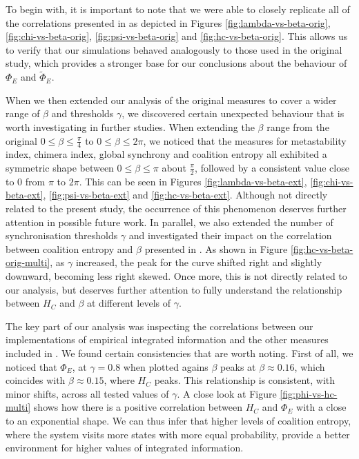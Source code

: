\documentclass[a4paper,11pt]{article}
\begin{document}
To begin with, it is important to note that we were able to closely replicate all of the correlations presented in \cite{Shanahan2010} as depicted in Figures \ref{fig:lambda-vs-beta-orig}, \ref{fig:chi-vs-beta-orig}, \ref{fig:psi-vs-beta-orig} and \ref{fig:hc-vs-beta-orig}. This allows us to verify that our simulations behaved analogously to those used in the original study, which provides a stronger base for our conclusions about the behaviour of $\Phi_E$ and $\widetilde{\Phi}_E$. 

When we then extended our analysis of the original measures to cover a wider range of $\beta$ and thresholds $\gamma$, we discovered certain unexpected behaviour that is worth investigating in further studies. When extending the $\beta$ range from the original $0 \leq \beta \leq \frac{\pi}{4}$ to $0 \leq \beta \leq 2\pi$, we noticed that the measures for metastability index, chimera index, global synchrony and coalition entropy all exhibited a symmetric shape between $0 \leq \beta \leq \pi$ about $\frac{\pi}{2}$, followed by a consistent value close to $0$ from $\pi$ to $2\pi$. This can be seen in Figures \ref{fig:lambda-vs-beta-ext}, \ref{fig:chi-vs-beta-ext}, \ref{fig:psi-vs-beta-ext} and \ref{fig:hc-vs-beta-ext}. Although not directly related to the present study, the occurrence of this phenomenon deserves further attention in possible future work. In parallel, we also extended the number of synchronisation thresholds  $\gamma$ and investigated their impact on the correlation between coalition entropy and $\beta$ presented in \cite{Shanahan2010}. As shown in Figure \ref{fig:hc-vs-beta-orig-multi}, as $\gamma$ increased, the peak for the curve shifted right and slightly downward, becoming less right skewed. Once more, this is not directly related to our analysis, but deserves further attention to fully understand the relationship between $H_C$ and $\beta$ at different levels of $\gamma$.

The key part of our analysis was inspecting the correlations between our implementations of empirical integrated information and the other measures included in \cite{Shanahan2010}. We found certain consistencies that are worth noting. First of all, we noticed that $\Phi_E$, at $\gamma = 0.8$ when plotted agains $\beta$ peaks at $\beta \approx 0.16$, which coincides with $\beta \approx 0.15$, where $H_C$ peaks. This relationship is consistent, with minor shifts, across all tested values of $\gamma$. A close look at Figure \ref{fig:phi-vs-hc-multi} shows how there is a positive correlation between $H_C$ and $\Phi_E$ with a close to an exponential shape. We can thus infer that higher levels of coalition entropy, where the system visits more states with more equal probability, provide a better environment for higher values of integrated information.
\end{document}
